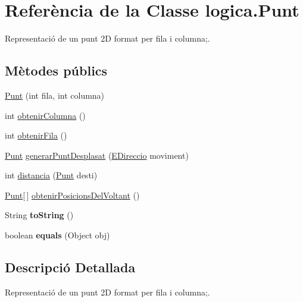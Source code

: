 \hypertarget{classlogica_1_1_punt}{\section{Referència de la Classe logica.\+Punt}
\label{classlogica_1_1_punt}
}


Representació de un punt 2\+D format per fila i columna;.  


\subsection*{Mètodes públics}
\begin{DoxyCompactItemize}
\item 
\hyperlink{classlogica_1_1_punt_ab09e076ff785e505903c303a6b390844}{Punt} (int fila, int columna)
\item 
int \hyperlink{classlogica_1_1_punt_a111fa13504fb44338c3ebae2e4eb104b}{obtenir\+Columna} ()
\item 
int \hyperlink{classlogica_1_1_punt_ac12261ec7534827c8cb7b4cba5bdd5db}{obtenir\+Fila} ()
\item 
\hyperlink{classlogica_1_1_punt}{Punt} \hyperlink{classlogica_1_1_punt_a8198234b3d10d9f83e634b0390c84dcb}{generar\+Punt\+Desplasat} (\hyperlink{enumlogica_1_1enumeracions_1_1_e_direccio}{E\+Direccio} moviment)
\item 
int \hyperlink{classlogica_1_1_punt_a20bb4168bbedb81b73947bfeaf31512a}{distancia} (\hyperlink{classlogica_1_1_punt}{Punt} desti)
\item 
\hyperlink{classlogica_1_1_punt}{Punt}\mbox{[}$\,$\mbox{]} \hyperlink{classlogica_1_1_punt_aae8b444d685a4fab660a51838fc42406}{obtenir\+Posicions\+Del\+Voltant} ()
\item 
\hypertarget{classlogica_1_1_punt_a7ecb9a24b9520b5036471fae8ef3aad5}{String {\bfseries to\+String} ()}\label{classlogica_1_1_punt_a7ecb9a24b9520b5036471fae8ef3aad5}

\item 
\hypertarget{classlogica_1_1_punt_a2734ff6782d3a601961365f018ba4402}{boolean {\bfseries equals} (Object obj)}\label{classlogica_1_1_punt_a2734ff6782d3a601961365f018ba4402}

\end{DoxyCompactItemize}


\subsection{Descripció Detallada}
Representació de un punt 2\+D format per fila i columna;. 

